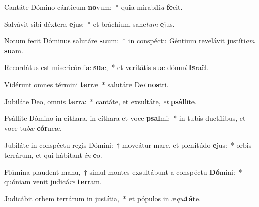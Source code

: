 \item Cantáte Dómino cánticum \textbf{no}vum:~* quia mirabíli\textit{a} \textbf{fe}cit.
\item Salvávit sibi déxtera \textbf{e}jus:~* et bráchium sanc\textit{tum} \textbf{e}jus.
\item Notum fecit Dóminus salutáre \textbf{su}um:~* in conspéctu Géntium revelávit justíti\textit{am} \textbf{su}am.
\item Recordátus est misericórdiæ \textbf{su}æ,~* et veritátis suæ dómu\textit{i} \textbf{Is}raël.
\item Vidérunt omnes términi \textbf{ter}ræ~* salutáre De\textit{i} \textbf{nos}tri.
\item Jubiláte Deo, omnis \textbf{ter}ra:~* cantáte, et exsultáte, \textit{et} \textbf{psál}lite.
\item Psállite Dómino in cíthara, in cíthara et voce \textbf{psal}mi:~* in tubis ductílibus, et voce tu\textit{bæ} \textbf{cór}neæ.
\item Jubiláte in conspéctu regis Dómini:~† moveátur mare, et plenitúdo \textbf{e}jus:~* orbis terrárum, et qui hábitant \textit{in} \textbf{e}o.
\item Flúmina plaudent manu,~† simul montes exsultábunt a conspéctu \textbf{Dó}mini:~* quóniam venit judicá\textit{re} \textbf{ter}ram.
\item Judicábit orbem terrárum in jus\textbf{tí}tia,~* et pópulos in æ\textit{qui}\textbf{tá}te.

